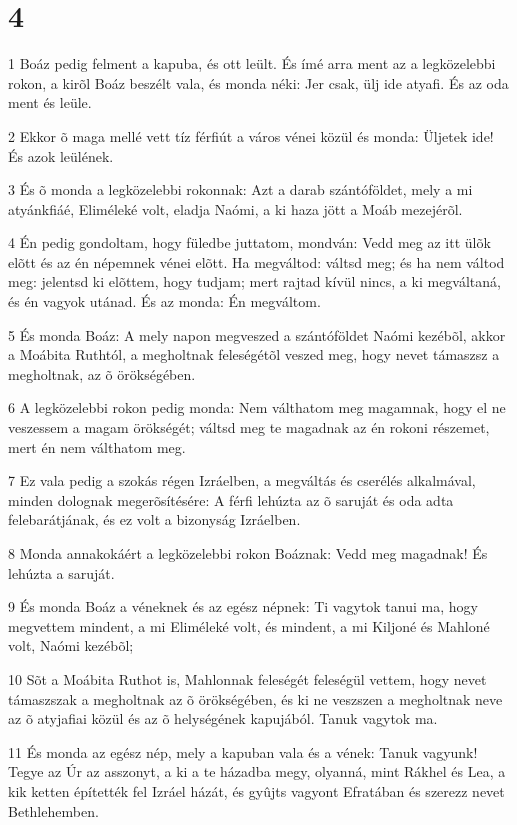 \chapter{4}

\par 1 Boáz pedig felment a kapuba, és ott leült. És ímé arra ment az a legközelebbi rokon, a kirõl Boáz beszélt vala, és monda néki: Jer csak, ülj ide atyafi. És az oda ment és leüle.
\par 2 Ekkor õ maga mellé vett tíz férfiút a város vénei közül és monda: Üljetek ide! És azok leülének.
\par 3 És õ monda a legközelebbi rokonnak: Azt a darab szántóföldet, mely a mi atyánkfiáé, Eliméleké volt, eladja Naómi, a ki haza jött a Moáb mezejérõl.
\par 4 Én pedig gondoltam, hogy füledbe juttatom, mondván: Vedd meg az itt ülõk elõtt és az én népemnek vénei elõtt. Ha megváltod: váltsd meg; és ha nem váltod meg: jelentsd ki elõttem, hogy tudjam; mert rajtad kívül nincs, a ki megváltaná, és én vagyok utánad. És az monda: Én megváltom.
\par 5 És monda Boáz: A mely napon megveszed a szántóföldet Naómi kezébõl, akkor a Moábita Ruthtól, a megholtnak feleségétõl veszed meg, hogy nevet támaszsz a megholtnak, az õ örökségében.
\par 6 A legközelebbi rokon pedig monda: Nem válthatom meg magamnak, hogy el ne veszessem a magam örökségét; váltsd meg te magadnak az én rokoni részemet, mert én nem válthatom meg.
\par 7 Ez vala pedig a szokás régen Izráelben, a megváltás és cserélés alkalmával, minden dolognak megerõsítésére: A férfi lehúzta az õ saruját és oda adta felebarátjának, és ez volt a bizonyság Izráelben.
\par 8 Monda annakokáért a legközelebbi rokon Boáznak: Vedd meg magadnak! És lehúzta a saruját.
\par 9 És monda Boáz a véneknek és az egész népnek: Ti vagytok tanui ma, hogy megvettem mindent, a mi Eliméleké volt, és mindent, a mi Kiljoné és Mahloné volt, Naómi kezébõl;
\par 10 Sõt a Moábita Ruthot is, Mahlonnak feleségét feleségül vettem, hogy nevet támaszszak a megholtnak az õ örökségében, és ki ne veszszen a megholtnak neve az õ atyjafiai közül és az õ helységének kapujából. Tanuk vagytok ma.
\par 11 És monda az egész nép, mely a kapuban vala és a vének: Tanuk vagyunk! Tegye az Úr az asszonyt, a ki a te házadba megy, olyanná, mint Rákhel és Lea, a kik ketten építették fel Izráel házát, és gyûjts vagyont Efratában és szerezz nevet Bethlehemben.
